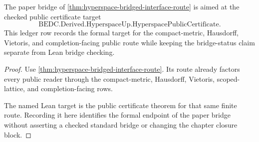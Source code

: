\begin{theorem}
\label{thm:hyperspace-bridged-route-formal-target}
The paper bridge of \autoref{thm:hyperspace-bridged-interface-route} is aimed at the checked public certificate target
$$
\text{BEDC.Derived.HyperspaceUp.HyperspacePublicCertificate}.
$$
This ledger row records the formal target for the compact-metric, Hausdorff, Vietoris, and completion-facing public route while keeping the bridge-status claim separate from Lean bridge checking.
\end{theorem}
\begin{proof}
Use \autoref{thm:hyperspace-bridged-interface-route}. Its route already factors every public reader through the compact-metric, Hausdorff, Vietoris, scoped-lattice, and completion-facing rows.

The named Lean target is the public certificate theorem for that same finite route. Recording it here identifies the formal endpoint of the paper bridge without asserting a checked standard bridge or changing the chapter closure block.
\end{proof}
